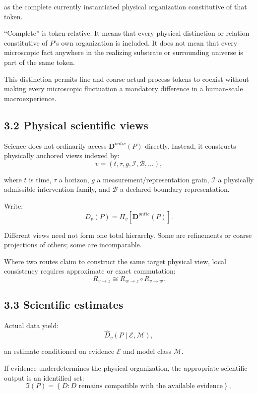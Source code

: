 \documentclass[
  11pt,
  a4paper,
]{article}
\begin{document}
as the complete currently instantiated physical organization
constitutive of that token.

``Complete'' is token-relative. It means that every physical distinction
or relation constitutive of \(P\)'s own organization is included. It
does not mean that every microscopic fact anywhere in the realizing
substrate or surrounding universe is part of the same token.

This distinction permits fine and coarse actual process tokens to
coexist without making every microscopic fluctuation a mandatory
difference in a human-scale macroexperience.

\hypertarget{physical-scientific-views}{%
\subsection{3.2 Physical scientific
views}\label{physical-scientific-views}}

Science does not ordinarily access \(\mathbf D^{ontic}(P)\) directly.
Instead, it constructs physically anchored views indexed by:
\nopagebreak[4]
\[
v=(t,\tau,g,\mathcal I,\mathcal B,\ldots),
\]

where \(t\) is time, \(\tau\) a horizon, \(g\) a
measurement/representation grain, \(\mathcal I\) a physically admissible
intervention family, and \(\mathcal B\) a declared boundary
representation.

Write:
\nopagebreak[4]
\[
D_v(P)
=
\Pi_v[
\mathbf D^{ontic}(P)
].
\]

Different views need not form one total hierarchy. Some are refinements
or coarse projections of others; some are incomparable.

Where two routes claim to construct the same target physical view, local
consistency requires approximate or exact commutation:
\nopagebreak[4]
\[
R_{v\to z}
\cong
R_{w\to z}\circ R_{v\to w}.
\]

\hypertarget{scientific-estimates}{%
\subsection{3.3 Scientific estimates}\label{scientific-estimates}}

Actual data yield:
\nopagebreak[4]
\[
\widehat D_v(P\mid\mathcal E,\mathcal M),
\]

an estimate conditioned on evidence \(\mathcal E\) and model class
\(\mathcal M\).

If evidence underdetermines the physical organization, the appropriate
scientific output is an identified set:
\nopagebreak[4]
\[
\mathfrak I(P)
=
\left\{
D:
D\text{ remains compatible with the available evidence}
\right\},
\]
\end{document}
